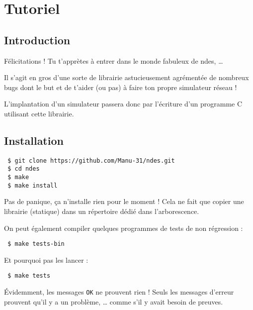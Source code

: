 %
\section{Tutoriel}
\label{section:user-tuto}

\subsection{Introduction}

   Félicitations ! Tu t'apprètes à entrer dans le monde fabuleux de
{\sc ndes}, \ldots

   Il s'agit en gros d'une sorte de librairie astucieusement
agrémentée de nombreux bugs dont le but et de t'aider (ou pas) à faire
ton propre simulateur réseau !

   L'implantation d'un simulateur passera donc par l'écriture d'un
programme C utilisant cette librairie.

\subsection{Installation}

\begin{verbatim}
 $ git clone https://github.com/Manu-31/ndes.git
 $ cd ndes
 $ make
 $ make install
\end{verbatim}

   Pas de panique, ça n'installe rien pour le moment ! Cela ne fait
que copier une librairie (statique) dans un répertoire dédié dans
l'arborescence.

   On peut également compiler quelques programmes de tests de non
régression :

\begin{verbatim}
 $ make tests-bin
\end{verbatim}
   Et pourquoi pas les lancer :

\begin{verbatim}
 $ make tests
\end{verbatim}

   Évidemment, les messages {\tt OK} ne prouvent rien ! Seuls les
messages d'erreur prouvent qu'il y a un problème, \ldots {} comme s'il
y avait besoin de preuves.

